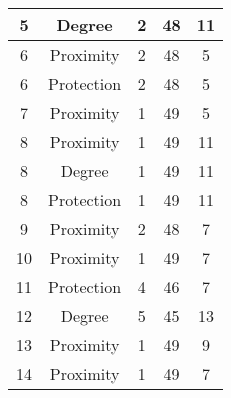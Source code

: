 \documentclass[results.tex]{subfiles}
\begin{document}
\begin{center}
\begin{tabular}{| c || c | c | c | c |}
            \hline
            5                       & Degree                       & 2                      & 48                      & 11                   \\
            \hline
            6                       & Proximity                    & 2                      & 48                      & 5                    \\
            \hline
            6                       & Protection                   & 2                      & 48                      & 5                    \\
            \hline
            7                       & Proximity                    & 1                      & 49                      & 5                    \\
            \hline
            8                       & Proximity                    & 1                      & 49                      & 11                   \\
            \hline
            8                       & Degree                       & 1                      & 49                      & 11                   \\
            \hline
            8                       & Protection                   & 1                      & 49                      & 11                   \\
            \hline
            9                       & Proximity                    & 2                      & 48                      & 7                    \\
            \hline
            10                      & Proximity                    & 1                      & 49                      & 7                    \\
            \hline
            11                      & Protection                   & 4                      & 46                      & 7                    \\
            \hline
            12                      & Degree                       & 5                      & 45                      & 13                   \\
            \hline
            13                      & Proximity                    & 1                      & 49                      & 9                    \\
            \hline
            14                      & Proximity                    & 1                      & 49                      & 7                    \\

\end{tabular}
\end{center}
\end{document}
